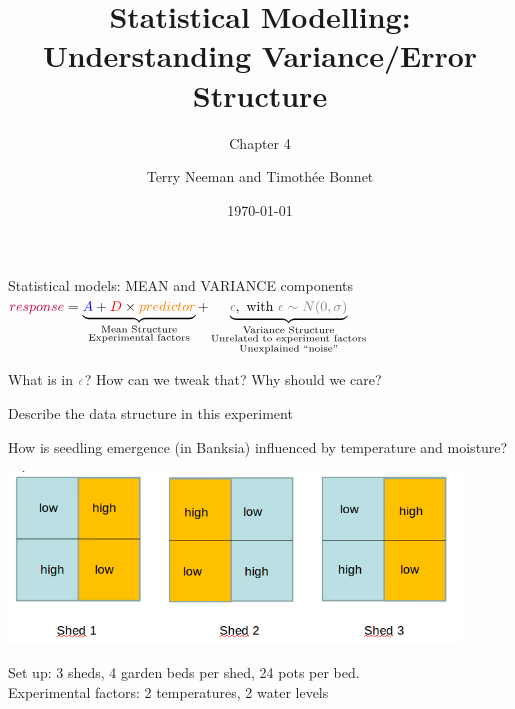 \documentclass{beamer}
\title{Statistical Modelling: Understanding Variance/Error Structure}
\subtitle{Chapter 4}
\author{Terry Neeman and Timoth\'ee Bonnet}
\date{\today}
\begin{document}



\begin{frame}{}
\maketitle

\end{frame}

\begin{frame}{Statistical models: MEAN and VARIANCE components}
\centering
  ${\color{purple}{response}} = \underbrace{{\color{blue}{A}} + {\color{red}{D}} \times {\color{orange}{predictor}}}_{\substack{\text{Mean Structure} \\ \text{Experimental factors}}} + 
  \underbrace{{\color{gray}{\epsilon}}, \text{ with } {\color{gray}{\epsilon \sim N(0,\sigma)}}}_{\substack{\text{Variance Structure} \\ \text{Unrelated to experiment factors} \\ \text{Unexplained ``noise''}}}$

  \pause 
  \vfill
  
  What is in ${\color{gray}{\epsilon}}$? How can we tweak that? Why should we care?
  \end{frame}

\begin{frame}{Describe the data structure in this experiment}
 
 How is seedling emergence (in Banksia) influenced by temperature and moisture?
 
 \includegraphics[width=0.9\textwidth]{Figures/banksiashed}


Set up: 3 sheds, 4 garden beds per shed, 24 pots per bed.\\
Experimental factors:  2 temperatures, 2 water levels

\end{frame}
\end{document}

